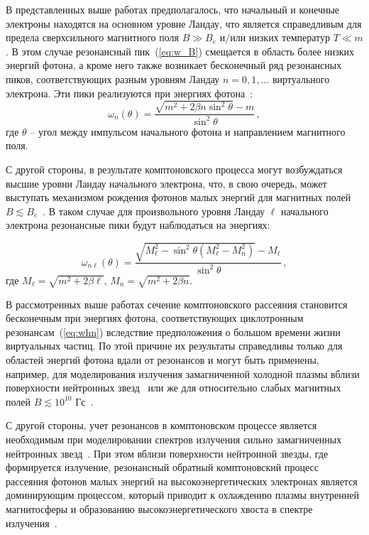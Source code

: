 \documentclass[cp1251%
               ]{jetp} %
\begin{document}
В представленных выше работах предполагалось, что начальный и конечные электроны находятся 
на основном уровне Ландау, что является справедливым для предела сверхсильного магнитного поля $B\gg B_e$
и/или низких температур $T\ll m$. В этом случае резонансный 
пик~(\ref{eq:w_B})  смещается в область более низких энергий фотона, а кроме 
него также возникает бесконечный ряд резонансных пиков, соответствующих разным 
уровням Ландау $n=0,1,\dots$ 
виртуального электрона. Эти пики реализуются при энергиях фотона~\cite{Daugherty:1986}:
\begin{equation}\label{eq:whn}
	\omega_n(\theta)= \frac{\sqrt{m^2+2 \beta n \sin^2\theta} - 
		m}{\sin^2\theta}\, ,
\end{equation}
где $\theta$ -- угол между импульсом начального фотона и направлением 
магнитного поля. 

С другой стороны, в результате комптоновского процесса могут возбуждаться 
высшие уровни Ландау начального электрона, что, в свою очередь, может выступать 
механизмом рождения фотонов малых энергий для магнитных полей $B\lesssim 
B_e$~\cite{Daugherty:1986,Bussard:1986}. В таком случае для произвольного уровня Ландау $\ell$ 
начального электрона резонансные пики будут наблюдаться на энергиях:

\begin{equation}\label{eq:resAll}
	\omega_{n\ell}(\theta)=\frac{\sqrt{M_\ell^2 - \sin^2\theta (M_\ell^2-M_n^2)}-M_\ell}{\sin^2\theta}\, ,
\end{equation}
где $M_\ell=\sqrt{m^2+2\beta \ell}$, $M_n=\sqrt{m^2+2\beta n}$.

В рассмотренных выше работах сечение комптоновского рассеяния 
становится бесконечным при энергиях фотона, соответствующих циклотронным 
резонансам~(\ref{eq:whn}) вследствие предположения о 
большом времени жизни виртуальных частиц. По этой причине их результаты 
справедливы только для областей энергий фотона вдали от резонансов
и могут быть применены, например, для моделирования излучения 
замагниченной 
	холодной плазмы вблизи поверхности нейтронных 
	звезд~\cite{Ozel:2001} или же для относительно слабых магнитных 
	полей $B\lesssim 10^{10}$ Гс~\cite{Zavlin:1996}.

С другой стороны, учет резонансов в комптоновском процессе является необходимым 
при моделировании спектров излучения сильно замагниченных нейтронных 
звезд~\cite{Alexander:1991,Araya:1999,Ho:2001,Lyutikov:2006,Potekhin:2004,Schonherr:2007,Nishimura:2008,Suleimanov:2009}.
При этом вблизи поверхности нейтронной звезды, где формируется излучение, резонансный 
обратный комптоновский процесс рассеяния фотонов малых энергий на высокоэнергетических электронах 
является доминирующим процессом, который приводит к охлаждению плазмы 
внутренней магнитосферы и образованию высокоэнергетического хвоста в спектре 
излучения~\cite{Fernandez:2007,Nobili:2008,Baring:2018,Beloborodov:2013}.
\end{document}
